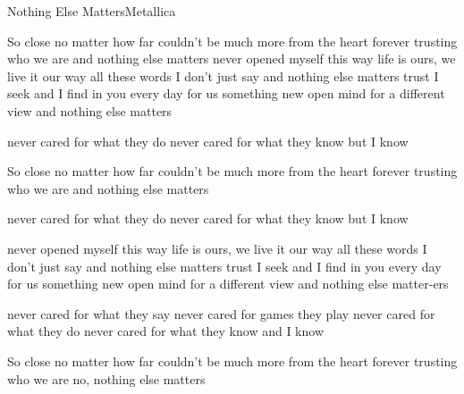 \begin{song}{Nothing Else Matters}{Metallica}{}

So close no matter how far
couldn't be much more from the heart
forever trusting who we are
and nothing else matters
never opened myself this way
life is ours, we live it our way
all these words I don't just say
and nothing else matters
trust I seek and I find in you
every day for us something new
open mind for a different view
and nothing else matters

never cared for what they do
never cared for what they know
but I know

So close no matter how far
couldn't be much more from the heart
forever trusting who we are
and nothing else matters

never cared for what they do
never cared for what they know
but I know

never opened myself this way
life is ours, we live it our way
all these words I don't just say
and nothing else matters
trust I seek and I find in you
every day for us something new
open mind for a different view
and nothing else matter-ers

never cared for what they say
never cared for games they play
never cared for what they do
never cared for what they know
and I know


So close no matter how far
couldn't be much more from the heart
forever trusting who we are
no, nothing else matters
\end{song}
